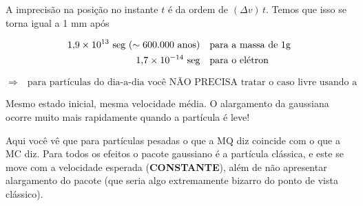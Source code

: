 A imprecisão na posição no instante $t$ é da ordem de $(\Delta v)\,t$. Temos que isso se torna igual a 1 mm após

\begin{align}
    1{,}9 \times 10^{13}\ \text{seg} \ (\sim 600.000 \text{ anos}) &\quad \text{para a massa de 1g} \notag \\
    1{,}7 \times 10^{-14}\ \text{seg} &\quad \text{para o elétron}
\label{eq:aula14_tempos_alargamento}
\end{align}

\begin{equation}
    \Longrightarrow \quad \boxed{\text{para partículas do dia-a-dia você NÃO PRECISA tratar o caso livre usando a MQ!!!}}
\label{eq:aula14_conclusao_classica}
\end{equation}

\begin{center}

\end{center}

Mesmo estado inicial, mesma velocidade média. O alargamento da gaussiana ocorre muito mais rapidamente quando a partícula é leve!

Aqui você vê que para partículas pesadas o que a MQ diz coincide com o que a MC diz. Para todos os efeitos o pacote gaussiano é a partícula clássica, e este se move com a velocidade esperada (\textbf{CONSTANTE}), além de não apresentar alargamento do pacote (que seria algo extremamente bizarro do ponto de vista clássico).

